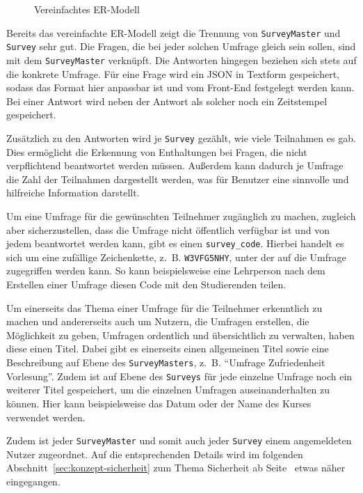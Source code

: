 \begin{figure}[ht]
	\centering
	\def\svgscale{0.72}
	\graphicspath{{img/backend/database/}}
	\scriptsize{}
	\caption{Vereinfachtes \acs{ER-Modell}}
	\label{fig:er-model-simplified}
\end{figure}

Bereits das vereinfachte \acs{ER-Modell} zeigt die Trennung von \texttt{SurveyMaster} und \texttt{Survey} sehr gut.
Die Fragen, die bei jeder solchen Umfrage gleich sein sollen, sind mit dem \texttt{SurveyMaster} verknüpft.
Die Antworten hingegen beziehen sich stets auf die konkrete Umfrage.
Für eine Frage wird ein \acs{JSON} in Textform gespeichert, sodass das Format hier anpassbar ist und vom Front-End festgelegt werden kann.
Bei einer Antwort wird neben der Antwort als solcher noch ein Zeitstempel gespeichert.

Zusätzlich zu den Antworten wird je \texttt{Survey} gezählt, wie viele Teilnahmen es gab.
Dies ermöglicht die Erkennung von Enthaltungen bei Fragen, die nicht verpflichtend beantwortet werden müssen.
Außerdem kann dadurch je Umfrage die Zahl der Teilnahmen dargestellt werden, was für Benutzer eine sinnvolle und hilfreiche Information darstellt.

Um eine Umfrage für die gewünschten Teilnehmer zugänglich zu machen, zugleich aber sicherzustellen, dass die Umfrage nicht öffentlich verfügbar ist und von jedem beantwortet werden kann, gibt es einen \texttt{survey\_code}.
Hierbei handelt es sich um eine zufällige Zeichenkette, z.~B. \texttt{W3VFG5NHY}, unter der auf die Umfrage zugegriffen werden kann.
So kann beispielsweise eine Lehrperson nach dem Erstellen einer Umfrage diesen Code mit den Studierenden teilen.

Um einerseits das Thema einer Umfrage für die Teilnehmer erkenntlich zu machen und andererseits auch um Nutzern, die Umfragen erstellen, die Möglichkeit zu geben, Umfragen ordentlich und übersichtlich zu verwalten, haben diese einen Titel.
Dabei gibt es einerseits einen allgemeinen Titel sowie eine Beschreibung auf Ebene des \texttt{SurveyMasters}, z.~B. \enquote{Umfrage Zufriedenheit Vorlesung}.
Zudem ist auf Ebene des \texttt{Surveys} für jede einzelne Umfrage noch ein weiterer Titel gespeichert, um die einzelnen Umfragen auseinanderhalten zu können.
Hier kann beispielsweise das Datum oder der Name des Kurses verwendet werden.

Zudem ist jeder \texttt{SurveyMaster} und somit auch jeder \texttt{Survey} einem angemeldeten Nutzer zugeordnet.
Auf die entsprechenden Details wird im folgenden Abschnitt~\ref{sec:konzept-sicherheit} zum Thema Sicherheit ab Seite~\pageref{sec:authentifizierung} etwas näher eingegangen.
